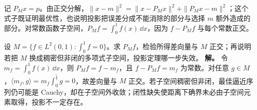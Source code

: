 记 \(P_Mx=p\)。由正交分解，\(\|x-m\|^2=\|x-P_Mx\|^2+\|P_Mx-m\|^2\)；这个式子既证明最优性，也说明投影把误差分成不能消除的部分与选择 \(m\) 额外造成的部分。对常数函数子空间，\(P_Mf=\int_0^1f(x)\,\dd x\)，因为 \(f-P_Mf\) 与每个常数正交。

\par
\begin{workedexample}
设 \(M=\{f\in L^2(0,1):\int_0^1f=0\}\)。求 \(P_Mf\)，检验所得差向量与 \(M\) 正交；再说明若把 \(M\) 换成稠密但非闭的多项式子空间，投影定理哪一步失效。
\textbf{解。} 令 \(m_f=\int_0^1f(x)\,\dd x\)，则 \(P_Mf=f-m_f\)，且 \(f-P_Mf=m_f\) 为常数。对任意 \(g\in M\)，\(\langle m_f,g\rangle=m_f\overline{\int_0^1g}=0\)，故差向量与 \(M\) 正交。若子空间稠密但非闭，最佳逼近序列仍可能是 Cauchy，却在子空间外收敛；闭性缺失使距离下确界未必由子空间元素取得，投影不一定存在。
\end{workedexample}
\par
